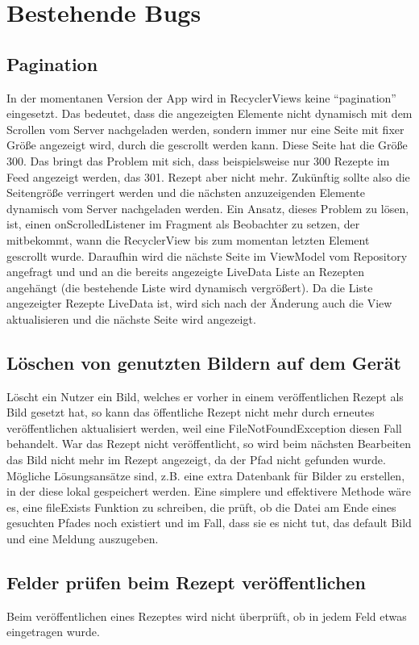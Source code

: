 \section{Bestehende Bugs}

\subsection{Pagination}
In der momentanen Version der App wird in RecyclerViews keine "`pagination"' eingesetzt. Das bedeutet, dass die angezeigten Elemente nicht dynamisch mit dem Scrollen vom Server nachgeladen werden, sondern immer nur eine Seite mit fixer Größe angezeigt wird, durch die gescrollt werden kann. Diese Seite hat die Größe 300. Das bringt das Problem mit sich, dass beispielsweise nur 300 Rezepte im Feed angezeigt werden, das 301. Rezept aber nicht mehr.
Zukünftig sollte also die Seitengröße verringert werden und die nächsten anzuzeigenden Elemente dynamisch vom Server nachgeladen werden.
Ein Ansatz, dieses Problem zu lösen, ist, einen onScrolledListener im Fragment als Beobachter zu setzen, der mitbekommt, wann die RecyclerView bis zum momentan letzten Element gescrollt wurde. Daraufhin wird  die nächste Seite im ViewModel vom Repository angefragt und und an die bereits angezeigte LiveData Liste an Rezepten angehängt (die bestehende Liste wird dynamisch vergrößert). Da die Liste angezeigter Rezepte LiveData ist, wird sich nach der Änderung auch die View aktualisieren und die nächste Seite wird angezeigt.

\subsection{Löschen von genutzten Bildern auf dem Gerät}
Löscht ein Nutzer ein Bild, welches er vorher in einem veröffentlichen Rezept als Bild gesetzt hat, so kann das öffentliche Rezept nicht mehr durch erneutes veröffentlichen aktualisiert werden, weil eine FileNotFoundException diesen Fall behandelt. War das Rezept nicht veröffentlicht, so wird beim nächsten Bearbeiten das Bild nicht mehr im Rezept angezeigt, da der Pfad nicht gefunden wurde. 
Mögliche Lösungsansätze sind, z.B. eine extra Datenbank für Bilder zu erstellen, in der diese lokal gespeichert werden. Eine simplere und effektivere Methode wäre es, eine fileExists Funktion zu schreiben, die prüft, ob die Datei am Ende eines gesuchten Pfades noch existiert und im Fall, dass sie es nicht tut, das default Bild und eine Meldung auszugeben.

\subsection{Felder prüfen beim Rezept veröffentlichen}
Beim veröffentlichen eines Rezeptes wird nicht überprüft, ob in jedem Feld etwas eingetragen wurde.

